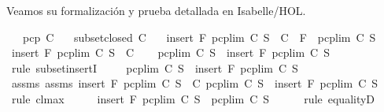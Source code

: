 \begin{isabellebody}
\begin{isamarkuptext}
  Veamos su formalización y prueba detallada en Isabelle/HOL.%
\end{isamarkuptext}\isamarkuptrue%
\isamarkupfalse%
\isanewline
\ \ \ {\isachardoublequoteopen}pcp\ C{\isachardoublequoteclose}\isanewline
\ \ \ {\isachardoublequoteopen}subset{\isacharunderscore}closed\ C{\isachardoublequoteclose}\isanewline
\ \ \ {\isachardoublequoteopen}insert\ F\ {\isacharparenleft}pcp{\isacharunderscore}lim\ C\ S{\isacharparenright}\ {\isasymin}\ C\ {\isasymLongrightarrow}\ F\ {\isasymin}\ pcp{\isacharunderscore}lim\ C\ S{\isachardoublequoteclose}\isanewline
%
\isadelimproof
%
\endisadelimproof
%
\isatagproof
{}\isamarkupfalse%
\ {\isacharminus}\isanewline
\ \ \isamarkupfalse%
\ {\isachardoublequoteopen}insert\ F\ {\isacharparenleft}pcp{\isacharunderscore}lim\ C\ S{\isacharparenright}\ {\isasymin}\ C{\isachardoublequoteclose}\isanewline
\ \ \isamarkupfalse%
\ {\isachardoublequoteopen}pcp{\isacharunderscore}lim\ C\ S\ {\isasymsubseteq}\ insert\ F\ {\isacharparenleft}pcp{\isacharunderscore}lim\ C\ S{\isacharparenright}{\isachardoublequoteclose}\isanewline
\ \ \ \ \isamarkupfalse%
\ {\isacharparenleft}rule\ subset{\isacharunderscore}insertI{\isacharparenright}\ \isanewline
\ \ \isamarkupfalse%
\ {\isachardoublequoteopen}pcp{\isacharunderscore}lim\ C\ S\ {\isacharequal}\ insert\ F\ {\isacharparenleft}pcp{\isacharunderscore}lim\ C\ S{\isacharparenright}{\isachardoublequoteclose}\isanewline
\ \ \ \ \isamarkupfalse%
\ assms{\isacharparenleft}{}{\isacharparenright}\ assms{\isacharparenleft}{}{\isacharparenright}\ {\isacartoucheopen}insert\ F\ {\isacharparenleft}pcp{\isacharunderscore}lim\ C\ S{\isacharparenright}\ {\isasymin}\ C{\isacartoucheclose}\ {\isacartoucheopen}pcp{\isacharunderscore}lim\ C\ S\ {\isasymsubseteq}\ insert\ F\ {\isacharparenleft}pcp{\isacharunderscore}lim\ C\ S{\isacharparenright}{\isacartoucheclose}\ \isamarkupfalse%
\ {\isacharparenleft}rule\ cl{\isacharunderscore}max{\isacharparenright}\isanewline
\ \ \isamarkupfalse%
\ \isamarkupfalse%
\ {\isachardoublequoteopen}insert\ F\ {\isacharparenleft}pcp{\isacharunderscore}lim\ C\ S{\isacharparenright}\ {\isasymsubseteq}\ pcp{\isacharunderscore}lim\ C\ S{\isachardoublequoteclose}\isanewline
\ \ \ \ \isamarkupfalse%
\ {\isacharparenleft}rule\ equalityD{}{\isacharparenright}\isanewline
\ \ \isamarkupfalse%

\end{isabellebody}

